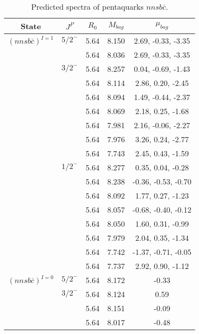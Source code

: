 \documentclass[prd,twocolumn,floatfix,nofootinbib]{revtex4}
\begin{document}
\renewcommand{\tabcolsep}{0.5cm}
\renewcommand{\arraystretch}{1.2}
\begin{table*}[!htbp]
    \caption{Predicted spectra of pentaquarks $nnsb\bar{c}$.}
    \begin{tabular}{ccccc}
        \hline\hline
        {\rm State} &$J^{P}$ &$R_{0}$ &$M_{bag}$ &$\mu_{bag}$ \\ \hline
        ${(nnsb\bar{c})}^{I=1}$
            &${5/2}^{-}$    &5.64  &8.150 &2.69, -0.33, -3.35 \\
            &               &5.64  &8.036 &2.69, -0.33, -3.35  \\
            &${3/2}^{-}$    &5.64   &8.257 &0.04, -0.69, -1.43  \\
            &               &5.64   &8.114 &2.86, 0.20, -2.45  \\
            &               &5.64   &8.094 &1.49, -0.44, -2.37  \\
            &               &5.64   &8.069 &2.18, 0.25, -1.68 \\
            &               &5.64   &7.981 &2.16, -0.06, -2.27  \\
            &               &5.64   &7.976 &3.26, 0.24, -2.77  \\
            &               &5.64   &7.743 &2.45, 0.43, -1.59  \\
            &${1/2}^{-}$    &5.64   &8.277 &0.35, 0.04, -0.28 \\
            &               &5.64    &8.238 &-0.36, -0.53, -0.70  \\
            &               &5.64    &8.092 &1.77, 0.27, -1.23  \\
            &               &5.64    &8.057 &-0.68, -0.40, -0.12  \\
            &               &5.64    &8.050 &1.60, 0.31, -0.99  \\
            &               &5.64    &7.979 &2.04, 0.35, -1.34  \\
            &               &5.64    &7.742 &-1.37, -0.71, -0.05  \\
            &               &5.64    &7.737 &2.92, 0.90, -1.12  \\
        ${(nnsb\bar{c})}^{I=0}$
            &${5/2}^{-}$    &5.64   &8.172 &-0.33 \\
            &${3/2}^{-}$    &5.64   &8.124 &0.59 \\
            &               &5.64   &8.151 &-0.09  \\
            &               &5.64   &8.017 &-0.48  \\

\end{tabular}
\end{table*}
\end{document}
